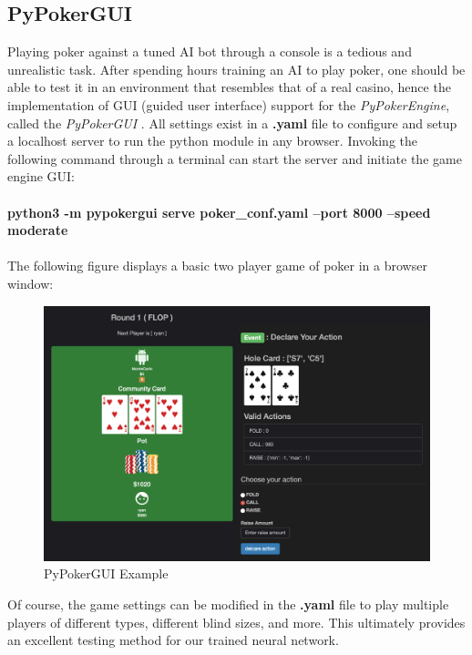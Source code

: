 \documentclass[12pt]{article}
\begin{document}
\subsection{PyPokerGUI}
Playing poker against a tuned AI bot through a console is a tedious and unrealistic task. After spending hours training an AI to play poker, one should be able to test it in an environment that resembles that of a real casino, hence the implementation of GUI (guided user interface) support for the \textit{PyPokerEngine}, called the \textit{PyPokerGUI} \cite{pokergui}. All settings exist in a \textbf{.yaml} file to configure and setup a localhost server to run the python module in any browser. Invoking the following command through a terminal can start the server and initiate the game engine GUI:\\\\
\textbf{python3 -m pypokergui serve poker\_conf.yaml --port 8000 --speed moderate}\\\\
The following figure displays a basic two player game of poker in a browser window:
\begin{figure}[H]
    \centering
    \includegraphics[width=.80\linewidth]{figures/gui}
    \caption{PyPokerGUI Example}
    \label{fig:gui}
\end{figure}
Of course, the game settings can be modified in the \textbf{.yaml} file to play multiple players of different types, different blind sizes, and more. This ultimately provides an excellent testing method for our trained neural network.
\end{document}
